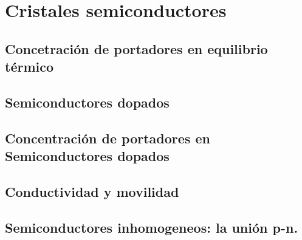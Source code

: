 \chapter{Cristales semiconductores} \label{Ch:09}

\section{Concetración de portadores en equilibrio térmico}

\section{Semiconductores dopados}

\section{Concentración de portadores en Semiconductores dopados}

\section{Conductividad y movilidad}

\section{Semiconductores inhomogeneos: la unión p-n.}

